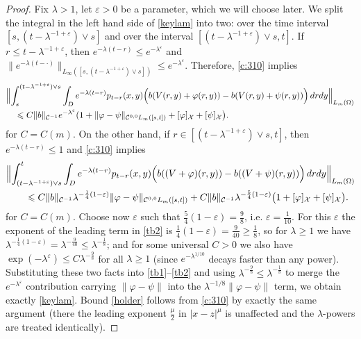 \documentclass[12pt]{article}
\theoremstyle{definition}
\DeclareMathOperator{\1}{\mathbbm{1}}%
\def\eps{\varepsilon}
\def\phi{\varphi}
\renewcommand{\ge}{\geqslant}
\renewcommand{\le}{\leqslant}
\newcommand{\nn}{\nonumber}
\newcommand{\C}{\mathcal{C}}
\newcommand{\X}{\mathcal{X}}
\begin{document}
\begin{proof}
Fix $\lambda>1$, let $\eps>0$ be a parameter, which we will choose later. We split the integral in the left hand side of \eqref{keylam} into two: over the time interval $[s,(t-\lambda^{-1+\eps})\vee s]$ and over the interval $[(t-\lambda^{-1+\eps})\vee s, t]$. If $r\le t-\lambda^{-1+\eps}$, then $e^{-\lambda(t-r)}\le e^{-\lambda^\eps}$ and $\|e^{-\lambda (t-\cdot)}\|_{L_\infty([s,(t-\lambda^{-1+\eps})\vee s])}\le e^{-\lambda^\eps}$. Therefore, \cref{c:310} implies 
\begin{align}\label{tb1}
&\Bigl\|\int_s^{(t-\lambda^{-1+\eps})\vee s}\int_ D e^{-\lambda(t-r)}p_{t-r}(x,y)\Bigl(b( V(r,y)+\phi(r,y))- b( V(r,y)+\psi(r,y))\Bigr)\,dr dy\Bigr\|_{L_m(\Omega)}\nn\\
&\quad\le 
C \|b\|_{\C^{-1}} e^{-\lambda^\eps}(1+\|\phi-\psi\|_{\C^{0,0}L_m([s,t])} +[\phi]_{\X}+[\psi]_{\X}\bigr). 
\end{align}
for $C=C(m)$. 
On the other hand, if $r\in [(t-\lambda^{-1+\eps})\vee s, t]$, then $e^{-\lambda(t-r)}\le 1$ and \cref{c:310} implies 
\begin{align}\label{tb2}
&\Bigl\|\int_{(t-\lambda^{-1+\eps})\vee s}^t\int_ D e^{-\lambda(t-r)}p_{t-r}(x,y)\Bigl(b( (V+\phi)(r,y))- b( (V+\psi)(r,y))\Bigr)\,dr dy\Bigr\|_{L_m(\Omega)}\nn\\
&\qquad\le C \|b\|_{\C^{-1}}                                                                                                                                                                     \lambda^{-\frac14(1-\eps)}\|\phi-\psi\|_{\C^{0,0}L_m([s,t])}+C \|b\|_{\C^{-1}} \lambda^{-\frac54(1-\eps)}\bigl(1+[\phi]_{\X}+[\psi]_{\X}\bigr). 
\end{align}
for $C=C(m)$. Choose now $\eps$ such that $\frac54(1-\eps)=\frac{9}8$, i.e. $\eps=\frac1{10}$. For this $\eps$ the exponent of the leading term in \eqref{tb2} is $\frac14(1-\eps)=\frac9{40}\ge\frac18$, so for $\lambda\ge1$ we have $\lambda^{-\frac14(1-\eps)}=\lambda^{-\frac9{40}}\le\lambda^{-\frac18}$; and for some universal $C>0$ we also have $\exp(-\lambda^\eps)\le C \lambda^{-\frac{9}8}$ for all $\lambda\ge1$ (since $e^{-\lambda^{1/10}}$ decays faster than any power). Substituting these two facts into \eqref{tb1}--\eqref{tb2} and using $\lambda^{-\frac98}\le\lambda^{-\frac18}$ to merge the $e^{-\lambda^\eps}$ contribution carrying $\|\phi-\psi\|$ into the $\lambda^{-1/8}\|\phi-\psi\|$ term, we obtain exactly \eqref{keylam}. 
Bound \eqref{holder} follows from \cref{c:310}  by exactly the same argument (there the leading exponent $\frac\mu2$ in $|x-z|^\mu$ is unaffected and the $\lambda$-powers are treated identically). 
\end{proof}	
\end{document}
